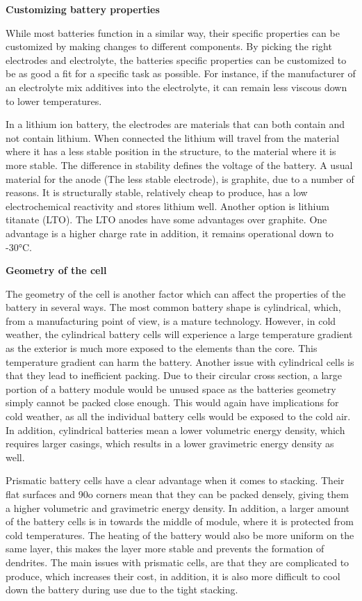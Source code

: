 \documentclass{article}
\begin{document}
\textbf{Customizing battery properties}

While most batteries function in a similar way, their specific properties can be customized by making changes to different components. By picking the right electrodes and electrolyte, the batteries specific properties can be customized to be as good a fit for a specific task as possible. For instance, if the manufacturer of an electrolyte mix additives into the electrolyte, it can remain less viscous down to lower temperatures.

In a lithium ion battery, the electrodes are materials that can both contain and not contain lithium. When connected the lithium will travel from the material where it has a less stable position in the structure, to the material where it is more stable. The difference in stability defines the voltage of the battery. A usual material for the anode (The less stable electrode), is graphite, due to a number of reasons. It is structurally stable, relatively cheap to produce, has a low electrochemical reactivity and stores lithium well. Another option is lithium titanate (LTO). The LTO anodes have some advantages over graphite. One advantage is a higher charge rate in addition, it remains operational down to -30°C.

\textbf{Geometry of the cell}

The geometry of the cell is another factor which can affect the properties of the battery in several ways. The most common battery shape is cylindrical, which, from a manufacturing point of view, is a mature technology. However, in cold weather, the cylindrical battery cells will experience a large temperature gradient as the exterior is much more exposed to the elements than the core. This temperature gradient can harm the battery. Another issue with cylindrical cells is that they lead to inefficient packing. Due to their circular cross section, a large portion of a battery module would be unused space as the batteries geometry simply cannot be packed close enough. This would again have implications for cold weather, as all the individual battery cells would be exposed to the cold air. In addition, cylindrical batteries mean a lower volumetric energy density, which requires larger casings, which results in a lower gravimetric energy density as well.

Prismatic battery cells have a clear advantage when it comes to stacking. Their flat surfaces and 90o corners mean that they can be packed densely, giving them a higher volumetric and gravimetric energy density. In addition, a larger amount of the battery cells is in towards the middle of module, where it is protected from cold temperatures. The heating of the battery would also be more uniform on the same layer, this makes the layer more stable and prevents the formation of dendrites. The main issues with prismatic cells, are that they are complicated to produce, which increases their cost, in addition, it is also more difficult to cool down the battery during use due to the tight stacking.
\end{document}
